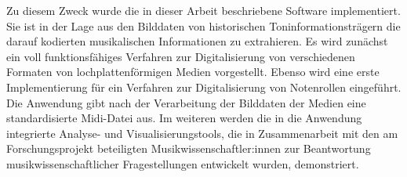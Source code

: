 Zu diesem Zweck wurde die in dieser Arbeit beschriebene Software implementiert.
Sie ist in der Lage aus den Bilddaten von historischen Toninformationsträgern die darauf kodierten musikalischen Informationen zu extrahieren.
Es wird zunächst ein voll funktionsfähiges Verfahren zur Digitalisierung von verschiedenen Formaten von lochplattenförmigen Medien vorgestellt.
Ebenso wird eine erste Implementierung für ein Verfahren zur Digitalisierung von Notenrollen eingeführt.
Die Anwendung gibt nach der Verarbeitung der Bilddaten der Medien eine standardisierte Midi-Datei aus.
Im weiteren werden die in die Anwendung integrierte Analyse- und Visualisierungstools, die in Zusammenarbeit mit den am Forschungsprojekt beteiligten Musikwissenschaftler:innen zur Beantwortung musikwissenschaftlicher Fragestellungen entwickelt wurden, demonstriert.

